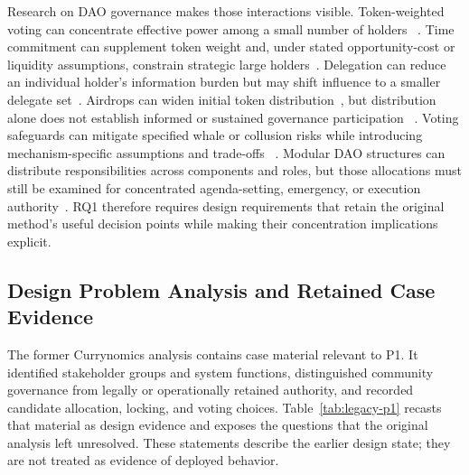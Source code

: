 \documentclass[referee,sn-basic]{sn-jnl}
\begin{document}
Research on DAO governance makes those interactions visible. Token-weighted
voting can concentrate effective power among a small number of holders
~\cite{Fritsch2024VotingPower}. Time commitment can supplement token weight
and, under stated opportunity-cost or liquidity assumptions, constrain
strategic large holders~\cite{Mohan2022,Han2026DAOGovernance}. Delegation can
reduce an individual holder's information burden but may shift influence to a
smaller delegate set~\cite{Buterin2021,Han2025Review}. Airdrops can widen
initial token distribution~\cite{Lommers2023,Allen2024Airdrops}, but distribution alone does not
establish informed or sustained governance participation
~\cite{Fritsch2024VotingPower,Kitzler2025Governance}. Voting safeguards can
mitigate specified whale or collusion risks while introducing
mechanism-specific assumptions and trade-offs
~\cite{Tamai2024WhaleCollusion}. Modular DAO structures can distribute
responsibilities across components and roles, but those allocations must still
be examined for concentrated agenda-setting, emergency, or execution
authority~\cite{Jungnickel2026ModularDAO}. RQ1
therefore requires design requirements that retain the original method's useful
decision points while making their concentration implications explicit.

\subsection{Design Problem Analysis and Retained Case Evidence}\label{subsec:problem-analysis}

The former Currynomics analysis contains case material relevant to P1. It
identified stakeholder groups and system functions, distinguished community
governance from legally or operationally retained authority, and recorded
candidate allocation, locking, and voting choices. Table~\ref{tab:legacy-p1}
recasts that material as design evidence and exposes the questions that the
original analysis left unresolved. These statements describe the earlier
design state; they are not treated as evidence of deployed behavior.
\end{document}
